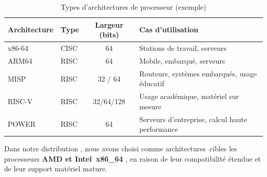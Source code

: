 \begin{table}[htbp]
  \centering
  \caption{Types d’architectures de processeur (exemple)}
  \label{tab:architectures}
  \begin{tabular}{|l| l| c| l|}
    \toprule
    \textbf{Architecture} & \textbf{Type} & \textbf{Largeur (bits)} & \textbf{Cas d'utilisation} \\
    \midrule
    x86-64   & CISC & 64           & Stations de travail, serveurs \\ \hline
    ARM64    & RISC & 64           & Mobile, embarqué, serveurs    \\ \hline
    MISP    & RISC   &  32 / 64      & Routeurs, systèmes embarqués, usage éducatif \\ \hline
    RISC-V   & RISC & 32/64/128    & Usage académique, matériel sur mesure \\\hline
    POWER    & RISC & 64           & Serveurs d'entreprise, calcul haute performance \\
    \bottomrule
  \end{tabular}
\end{table}

Dans notre distribution , nous avons choisi comme architectures cibles  les processeurs \textbf{AMD et Intel x86\_64 }, en raison de leur compatibilité étendue et de leur support matériel mature. 





